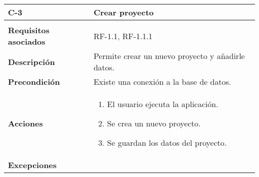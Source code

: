 \begin{longtable}[H]{@{}ll@{}}
\toprule
\begin{minipage}[b]{0.23\columnwidth}\raggedright\strut
\textbf{C-3}\strut
\end{minipage} & \begin{minipage}[b]{0.71\columnwidth}\raggedright\strut
\textbf{Crear proyecto}\strut
\end{minipage}\tabularnewline
\midrule
\endhead
\tabularnewline
\begin{minipage}[t]{0.23\columnwidth}\raggedright\strut
\textbf{Requisitos asociados}\strut
\end{minipage} & \begin{minipage}[t]{0.71\columnwidth}\raggedright\strut
RF-1.1, RF-1.1.1\strut
\end{minipage}\tabularnewline
\begin{minipage}[t]{0.23\columnwidth}\raggedright\strut
\textbf{Descripción}\strut
\end{minipage} & \begin{minipage}[t]{0.71\columnwidth}\raggedright\strut
Permite crear un nuevo proyecto y añadirle datos.\strut
\end{minipage}\tabularnewline
\begin{minipage}[t]{0.23\columnwidth}\raggedright\strut
\textbf{Precondición}\strut
\end{minipage} & \begin{minipage}[t]{0.71\columnwidth}\raggedright\strut
Existe una conexión a la base de datos.
\strut
\end{minipage}\tabularnewline
\begin{minipage}[t]{0.23\columnwidth}\raggedright\strut
\textbf{Acciones}\strut
\end{minipage} & \begin{minipage}[t]{0.71\columnwidth}\raggedright\strut
\begin{enumerate}
\def\labelenumi{\arabic{enumi}.}
\item
El usuario ejecuta la aplicación.
\item
Se crea un nuevo proyecto.
\item
Se guardan los datos del proyecto.
\end{enumerate}\strut
\end{minipage}\tabularnewline
\begin{minipage}[t]{0.23\columnwidth}\raggedright\strut
\textbf{Excepciones}\strut
\end{minipage} & \begin{minipage}[t]{0.71\columnwidth}\raggedright\strut

\end{minipage}
\end{longtable}
